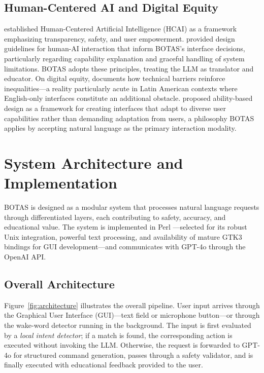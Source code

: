 \documentclass[10pt,a4paper]{article}
\begin{document}
\subsection{Human-Centered AI and Digital Equity}
\label{subsec:hcai-accessibility}

\citet{Shneiderman2020, Shneiderman2022} established Human-Centered Artificial Intelligence (HCAI) as a framework emphasizing transparency, safety, and user empowerment. \citet{Amershi2019} provided design guidelines for human-AI interaction that inform BOTAS's interface decisions, particularly regarding capability explanation and graceful handling of system limitations. BOTAS adopts these principles, treating the LLM as translator and educator. On digital equity, \citet{Warschauer2004} documents how technical barriers reinforce inequalities---a reality particularly acute in Latin American contexts where English-only interfaces constitute an additional obstacle. \citet{Wobbrock2011} proposed ability-based design as a framework for creating interfaces that adapt to diverse user capabilities rather than demanding adaptation from users, a philosophy BOTAS applies by accepting natural language as the primary interaction modality.


\section{System Architecture and Implementation}
\label{sec:methodology}

BOTAS is designed as a modular system that processes natural language requests through differentiated layers, each contributing to safety, accuracy, and educational value. The system is implemented in Perl \citep{Wall2000}---selected for its robust Unix integration, powerful text processing, and availability of mature GTK3 \citep{GTK2023} bindings for GUI development---and communicates with GPT-4o \citep{OpenAI2024} through the OpenAI API.

\subsection{Overall Architecture}
\label{subsec:architecture}

Figure~\ref{fig:architecture} illustrates the overall pipeline. User input arrives through the Graphical User Interface (GUI)---text field or microphone button---or through the wake-word detector running in the background. The input is first evaluated by a \emph{local intent detector}; if a match is found, the corresponding action is executed without invoking the LLM. Otherwise, the request is forwarded to GPT-4o for structured command generation, passes through a safety validator, and is finally executed with educational feedback provided to the user.
\end{document}
